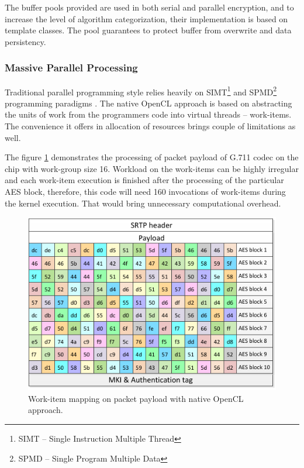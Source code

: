 The buffer pools provided are used in both serial and parallel encryption,
and to increase the level of algorithm categorization, their implementation is
based on template classes. The pool guarantees to protect buffer from overwrite
and data persistency.

\subsubsection*{Massive Parallel Processing}
Traditional parallel programming style relies heavily on SIMT\footnote{ SIMT -- 
Single Instruction Multiple Thread} and SPMD\footnote{ SPMD -- Single Program
Multiple Data} programming paradigms \cite{Flynn:1972}. The native OpenCL 
approach is based on abstracting the units of work from the programmers code 
into virtual threads -- work-items. The convenience it offers in allocation
of resources brings couple of limitations as well. 

The figure \ref{mp_payload} demonstrates the processing of packet payload of 
G.711 codec on the chip with work-group size 16. Workload on the work-items can
be highly irregular and each work-item execution is finished after the 
processing of the particular AES block, therefore, this code will need 160
invocations of work-items during the kernel execution. That would bring
unnecessary computational overhead.    

\begin{figure}[H]
\centering
\includegraphics[width=13cm]{fig/packet_mp.pdf}
\caption[OpenCL work-item mapping]{Work-item mapping on packet payload with 
native OpenCL approach.}
\label{mp_payload}
\end{figure}



